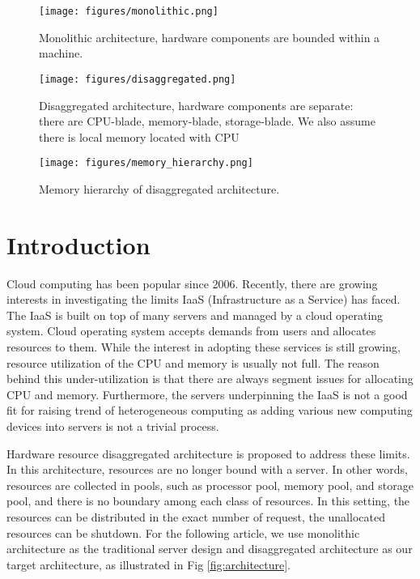\documentclass[twocolumn]{article}
\begin{document}
\begin{figure*}[h!]
     \centering
     \captionsetup[subfigure]{position=b}
     \begin{subfigure}[b]{0.28\textwidth}
         \centering
         \texttt{[image: figures/monolithic.png]}
         \caption{Monolithic architecture, hardware components are bounded within a machine.}
         \label{fig:monolithic architecture}
     \end{subfigure}
     \hfill
     \begin{subfigure}[b]{0.68\textwidth}
         \centering
         \texttt{[image: figures/disaggregated.png]}
         \caption{Disaggregated architecture, hardware components are separate: there are CPU-blade, memory-blade, storage-blade. We also assume there is local memory located with CPU}
         \label{fig:disaggregated architecture}
     \end{subfigure}
     \caption{Monolithic architecture and disaggregated architecture.}
     \label{fig:architecture}
\end{figure*}

\begin{figure}[h!]
     \centering
     \texttt{[image: figures/memory\_hierarchy.png]}
     \caption{Memory hierarchy of disaggregated architecture.}
     \label{fig:memory hierarchy}
\end{figure}

\section{Introduction}
Cloud computing has been popular since 2006. Recently, there are growing interests in investigating the limits IaaS (Infrastructure as a Service) has faced. The IaaS is built on top of many servers and managed by a cloud operating system. Cloud operating system accepts demands from users and allocates resources to them. While the interest in adopting these services is still growing, resource utilization of the CPU and memory is usually not full. The reason behind this under-utilization is that there are always segment issues for allocating CPU and memory. Furthermore, the servers underpinning the IaaS is not a good fit for raising trend of heterogeneous computing as adding various new computing devices into servers is not a trivial process.

Hardware resource disaggregated architecture is proposed to address these limits. In this architecture, resources are no longer bound with a server. In other words, resources are collected in pools, such as processor pool, memory pool, and storage pool, and there is no boundary among each class of resources. In this setting, the resources can be distributed in the exact number of request, the unallocated resources can be shutdown. For the following article, we use monolithic architecture as the traditional server design and disaggregated architecture as our target architecture, as illustrated in Fig \ref{fig:architecture}.
\end{document}

